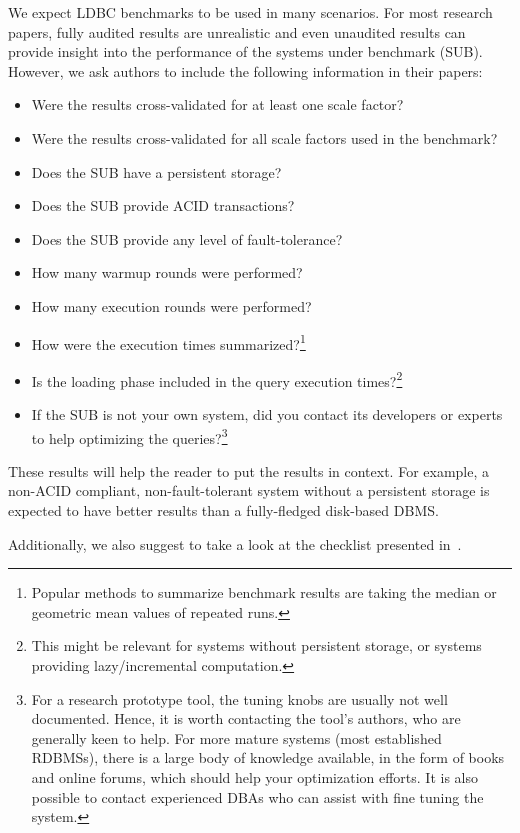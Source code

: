 We expect LDBC benchmarks to be used in many scenarios.
For most research papers, fully audited results are unrealistic and even unaudited results can provide insight into the performance of the systems under benchmark (SUB). However, we ask authors to include the following information in their papers:

\begin{itemize}
\item Were the results cross-validated for at least one scale factor?
\item Were the results cross-validated for all scale factors used in the benchmark?
\item Does the SUB have a persistent storage?
\item Does the SUB provide ACID transactions?
\item Does the SUB provide any level of fault-tolerance?
\item How many warmup rounds were performed?
\item How many execution rounds were performed?
\item How were the execution times summarized?\footnote{Popular methods to summarize benchmark results are taking the median or geometric mean values of repeated runs.}
\item Is the loading phase included in the query execution times?\footnote{This might be relevant for systems without persistent storage, or systems providing lazy/incremental computation.}
\item If the SUB is not your own system, did you contact its developers or experts to help optimizing the queries?\footnote{For a research prototype tool, the tuning knobs are usually not well documented. Hence, it is worth contacting the tool's authors, who are generally keen to help. For more mature systems (\eg most established RDBMSs), there is a large body of knowledge available, in the form of books and online forums, which should help your optimization efforts. It is also possible to contact experienced DBAs who can assist with fine tuning the system.}
\end{itemize}

These results will help the reader to put the results in context. For example, a non-ACID compliant, non-fault-tolerant system without a persistent storage is expected to have better results than a fully-fledged disk-based DBMS.

Additionally, we also suggest to take a look at the checklist presented in~\cite{DBLP:conf/sigmod/RaasveldtHGM18}.